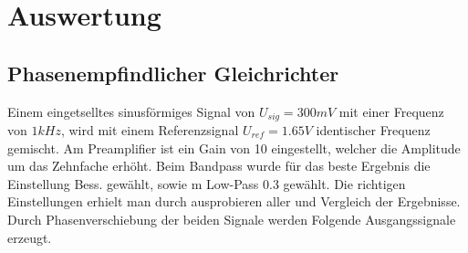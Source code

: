 \section{Auswertung}
\label{sec:Auswertung}

\subsection{Phasenempfindlicher Gleichrichter}
\label{sec:Gleichrichter}

Einem eingetselltes sinusförmiges Signal von $U_{sig} = 300 mV$ mit einer Frequenz von $1 kHz$,
wird mit einem Referenzsignal $U_{ref} = 1.65 V$ identischer Frequenz gemischt.
Am Preamplifier ist ein Gain von 10 eingestellt, welcher die Amplitude um das Zehnfache erhöht.
Beim Bandpass wurde für das beste Ergebnis die Einstellung Bess. gewählt, sowie m Low-Pass 0.3 gewählt.
Die richtigen Einstellungen erhielt man durch ausprobieren aller und Vergleich der Ergebnisse.
Durch Phasenverschiebung der beiden Signale werden Folgende Ausgangssignale erzeugt.

